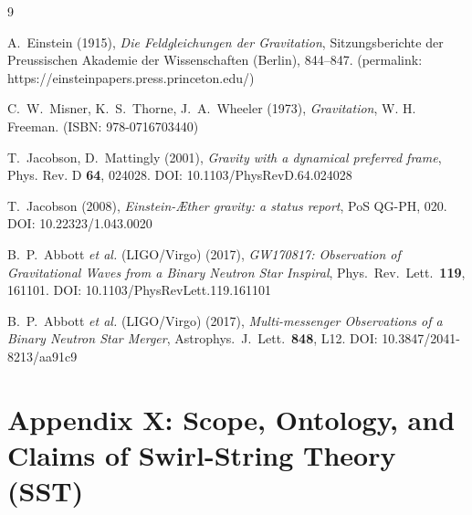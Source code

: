 \documentclass[11pt]{article}
\begin{document}
            \begin{thebibliography}{9}

                A.~Einstein (1915),
                \textit{Die Feldgleichungen der Gravitation},
                Sitzungsberichte der Preussischen Akademie der Wissenschaften (Berlin), 844--847.
                (permalink: https://einsteinpapers.press.princeton.edu/)

                C.~W.~Misner, K.~S.~Thorne, J.~A.~Wheeler (1973),
                \textit{Gravitation},
                W. H. Freeman. (ISBN: 978-0716703440)

                T.~Jacobson, D.~Mattingly (2001),
                \textit{Gravity with a dynamical preferred frame},
                Phys. Rev. D \textbf{64}, 024028.
                DOI: 10.1103/PhysRevD.64.024028

                T.~Jacobson (2008),
                \textit{Einstein-\AE ther gravity: a status report},
                PoS QG-PH, 020.
                DOI: 10.22323/1.043.0020

                B.~P.~Abbott \textit{et al.} (LIGO/Virgo) (2017),
                \textit{GW170817: Observation of Gravitational Waves from a Binary Neutron Star Inspiral},
                Phys.\ Rev.\ Lett.\ \textbf{119}, 161101.
                DOI: 10.1103/PhysRevLett.119.161101

                B.~P.~Abbott \textit{et al.} (LIGO/Virgo) (2017),
                \textit{Multi-messenger Observations of a Binary Neutron Star Merger},
                Astrophys.\ J.\ Lett.\ \textbf{848}, L12.
                DOI: 10.3847/2041-8213/aa91c9

            \end{thebibliography}



            \appendix
    \section*{Appendix X: Scope, Ontology, and Claims of Swirl-String Theory (SST)}
\end{document}
